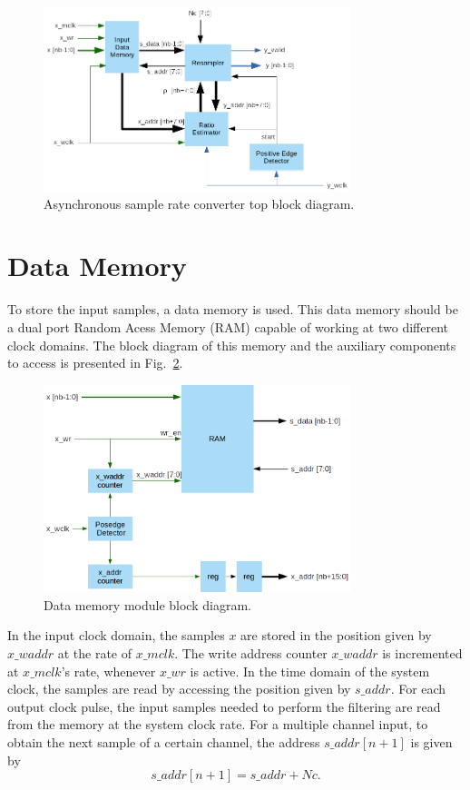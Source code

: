 \begin{figure}[!htb]
  \centering
  \includegraphics[width=0.8\textwidth]{Figures/asrc_top_bd.png}
  \caption{Asynchronous sample rate converter top block diagram.}
  \label{fig:bd_top}
\end{figure}

\section{Data Memory}
\label{section:data_mem}

To store the input samples, a data memory is used. This data memory should be a
dual port Random Acess Memory (RAM) capable of working at two different clock
domains. The block diagram of this memory and the auxiliary components to access
is presented in Fig.~\ref{fig:bd_datamem}.

\begin{figure}[!htb]
  \centering
  \includegraphics[width=0.8\textwidth]{Figures/asrc_datamem_bd.png}
  \caption{Data memory module block diagram.}
  \label{fig:bd_datamem}
\end{figure}

In the input clock domain, the samples $x$ are stored in the position given by
$x\_waddr$ at the rate of $x\_mclk$. The write address counter $x\_waddr$ is
incremented at $x\_mclk$'s rate, whenever $x\_wr$ is active.
In the time domain of the system clock, the
samples are read by accessing the position given by $s\_addr$. For each output
clock pulse, the input samples needed to perform the filtering are read from the
memory at the system clock rate. For a multiple channel input, to obtain the
next sample of a certain channel, the address $s\_addr[n+1]$ is given by
\begin{equation}
  s\_addr[n+1] = s\_addr+Nc.
  \label{eq:datamem_nextsample}
\end{equation}

